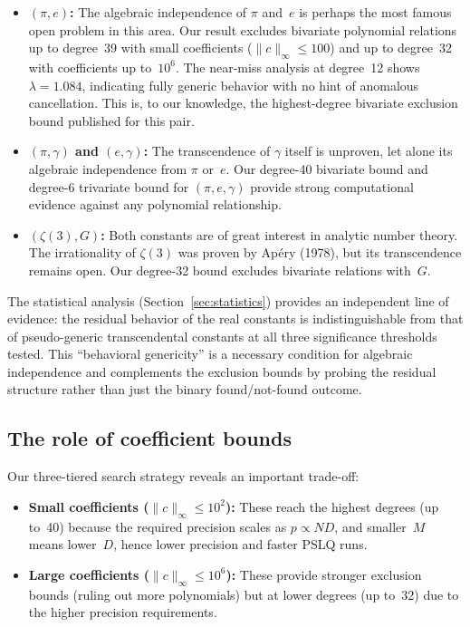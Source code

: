 \documentclass[11pt]{amsart}
\theoremstyle{remark}
\newcommand{\norm}[1]{\lVert #1 \rVert}
\begin{document}
\begin{itemize}
\item \textbf{$(\pi,e)$:} The algebraic independence of $\pi$ and~$e$ is perhaps the
  most famous open problem in this area. Our result excludes bivariate polynomial
  relations up to degree~39 with small coefficients ($\norm{c}_\infty\le 100$) and up
  to degree~32 with coefficients up to~$10^6$. The near-miss analysis at degree~12
  shows $\lambda = 1.084$, indicating fully generic behavior with no hint of
  anomalous cancellation. This is, to our knowledge, the highest-degree bivariate
  exclusion bound published for this pair.

\item \textbf{$(\pi,\gamma)$ and $(e,\gamma)$:} The transcendence of $\gamma$ itself
  is unproven, let alone its algebraic independence from $\pi$ or~$e$. Our degree-40
  bivariate bound and degree-6 trivariate bound for $(\pi,e,\gamma)$ provide strong
  computational evidence against any polynomial relationship.

\item \textbf{$(\zeta(3),G)$:} Both constants are of great interest in analytic
  number theory. The irrationality of $\zeta(3)$ was proven by Ap\'ery (1978), but
  its transcendence remains open. Our degree-32 bound excludes bivariate relations
  with~$G$.
\end{itemize}

The statistical analysis (Section~\ref{sec:statistics}) provides an independent line
of evidence: the residual behavior of the real constants is indistinguishable from
that of pseudo-generic transcendental constants at all three significance thresholds
tested. This ``behavioral genericity'' is a necessary condition for algebraic
independence and complements the exclusion bounds by probing the residual structure
rather than just the binary found/not-found outcome.

\subsection{The role of coefficient bounds}\label{ssec:coeffbounds}

Our three-tiered search strategy reveals an important trade-off:

\begin{itemize}
\item \textbf{Small coefficients ($\norm{c}_\infty\le 10^2$):} These reach the
  highest degrees (up to~40) because the required precision scales as $p\propto ND$,
  and smaller~$M$ means lower~$D$, hence lower precision and faster PSLQ runs.

\item \textbf{Large coefficients ($\norm{c}_\infty\le 10^6$):} These provide
  stronger exclusion bounds (ruling out more polynomials) but at lower degrees (up
  to~32) due to the higher precision requirements.
\end{itemize}
\end{document}
